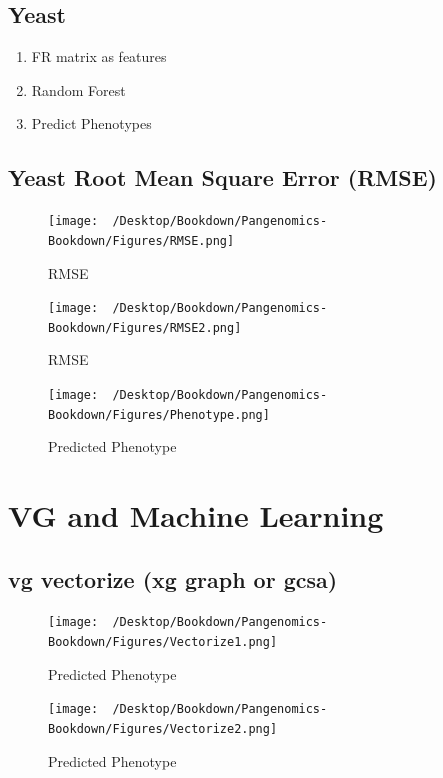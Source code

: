 \documentclass[
]{book}
\providecommand{\tightlist}{%
  \setlength{\itemsep}{0pt}\setlength{\parskip}{0pt}}
\begin{document}
\hypertarget{yeast}{%
\subsection{Yeast}\label{yeast}}

\begin{enumerate}
\def\labelenumi{\arabic{enumi}.}
\tightlist
\item
  FR matrix as features
\item
  Random Forest
\item
  Predict Phenotypes
\end{enumerate}

\hypertarget{yeast-root-mean-square-error-rmse}{%
\subsection{Yeast Root Mean Square Error (RMSE)}\label{yeast-root-mean-square-error-rmse}}

\begin{figure}
\centering
\texttt{[image: ~/Desktop/Bookdown/Pangenomics-Bookdown/Figures/RMSE.png]}
\caption{RMSE}
\end{figure}

\begin{figure}
\centering
\texttt{[image: ~/Desktop/Bookdown/Pangenomics-Bookdown/Figures/RMSE2.png]}
\caption{RMSE}
\end{figure}

\begin{figure}
\centering
\texttt{[image: ~/Desktop/Bookdown/Pangenomics-Bookdown/Figures/Phenotype.png]}
\caption{Predicted Phenotype}
\end{figure}

\hypertarget{vg-and-machine-learning}{%
\section{VG and Machine Learning}\label{vg-and-machine-learning}}

\hypertarget{vg-vectorize-xg-graph-or-gcsa}{%
\subsection{vg vectorize (xg graph or gcsa)}\label{vg-vectorize-xg-graph-or-gcsa}}

\begin{figure}
\centering
\texttt{[image: ~/Desktop/Bookdown/Pangenomics-Bookdown/Figures/Vectorize1.png]}
\caption{Predicted Phenotype}
\end{figure}

\begin{figure}
\centering
\texttt{[image: ~/Desktop/Bookdown/Pangenomics-Bookdown/Figures/Vectorize2.png]}
\caption{Predicted Phenotype}
\end{figure}

  
\end{document}
